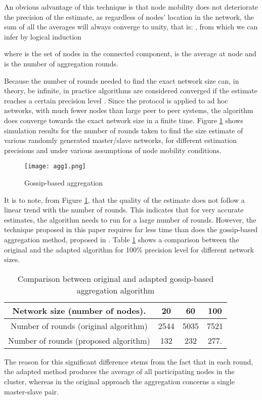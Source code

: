 \documentclass[twocolumn,10pt,conference]{IEEEtran}
\begin{document}
An obvious advantage of this technique is that node mobility does not deteriorate the precision of the estimate, as 
regardless of nodes' location in the network, the sum of all the averages will always converge to unity, that is: 
, from which we can infer by logical induction

where  is the set of nodes in the connected component,  is the average at node  and  is the number of 
aggregation rounds.

Because the number of rounds needed to find the exact network size can, in theory, be infinite, in practice algorithms are 
considered converged if the estimate reaches a certain precision level \cite{ref21}. Since the protocol is applied to 
ad hoc networks, with much fewer nodes than large peer to peer systems, the algorithm does converge towards the exact 
network size in a finite time. Figure \ref{aggr} shows simulation results for the number of rounds taken to find the size estimate 
of various randomly generated master/slave networks, for different estimation precisions and under various assumptions of 
node mobility conditions.

\begin{figure}[h!]
\begin{center}
\texttt{[image: agg1.png]}
\caption{Gossip-based aggregation}
\label{aggr}
\end{center}
\end{figure}

It is to note, from Figure \ref{aggr}, that the quality of the estimate does not follow a linear trend with the number of rounds. 
This indicates that for very accurate estimates, the algorithm needs to run for a large number of rounds. However, the 
technique proposed in this paper requires far less time than does the gossip-based aggregation method, proposed in 
\cite{ref22}. Table \ref{tbl} shows a comparison between the original and the adapted algorithm for 100\% precision level for 
different network sizes. 

\begin{table}[h!]
\caption{Comparison between original and adapted gossip-based aggregation algorithm}
\centering
\begin{tabular}{|c|c|c|c|}
\hline
Network size (number of nodes). & 20 & 60 & 100 \\
\hline
Number of rounds (original algorithm) & 2544 & 5035 & 7521\\
\hline
Number of rounds (proposed algorithm) & 132 & 232 & 277.\\
\hline
\end{tabular}
\label{tbl}
\end{table}
The reason for this significant difference stems from the fact that in each round, the adapted method produces the average of all participating nodes in the cluster, whereas in the original approach the aggregation concerns a single master-slave pair.
\end{document}
